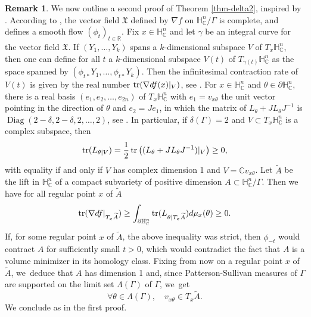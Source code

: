 \documentclass[JEP,XML,SOM,Unicode,NoEqCountersInSection,published]{cedram}
\theoremstyle{definition}
\newtheorem*{remark}{Remark}
\newcommand{\C}{\mathbb{C}}
\newcommand{\R}{\mathbb{R}}
\newcommand{\HNC}{\mathbb{H}^{n}_{\C}}
\newcommand{\PHNC}{\partial\mathbb{H}^{n}_{\C}}
\DeclareMathOperator{\Diag}{Diag}
\newcommand{\tr}{\textup{tr}}
\def\C{\mathbb{C}}
\newcommand{\HNC}{\mathbb{H}^{n}_{\C}}
\begin{document}
\begin{remark}
We now outline a second proof of Theorem \ref{thm-delta2}, inspired by \cite[Th.\,1.5]{connellNaturalFlowCritical2023}. According to \cite[Lem.\,2.2]{connellNaturalFlowCritical2023}, the vector field $\mathfrak{X}$ defined by $\nabla{f}$ on $\HNC/\Gamma$ is complete, and defines a smooth flow $(\phi_t)_{t\in \R}$. Fix $x\in \HNC$ and let $\gamma$ be an integral curve for the vector field $\mathfrak{X}$. If $(Y_1,\dots,Y_k)$ spans a $k$-dimensional subspace $V$ of $T_x\HNC$, then one can define for all $t$ a $k$-dimensional subspace $V(t)$ of $T_{\gamma(t)}\HNC$ as the space spanned by $(\phi_{t\ast}Y_1,\dots,\phi_{t\ast}Y_k)$. Then the infinitesimal contraction rate of $V(t)$ is given by the real number $\tr(\nabla d{f}(x)\vert_{ V})$, see \cite[Lem.\,2.5]{connellNaturalFlowCritical2023}. For $x\in \HNC$ and $\theta\in \PHNC$, there is a real basis $(e_1,e_2,\dots,e_{2n})$ of $T_{x}\HNC$ with $e_1=v_{x\theta}$ the unit vector pointing in the direction of $\theta$ and $e_2=Je_1$, in which the matrix of $L_{\theta} + JL_{\theta}J^{-1}$ is
$\Diag(2-\delta,2-\delta,2,\dots,2)$, see \cite[Proof of Lem.\,2.6]{connellNaturalFlowCritical2023}.
In particular, if $\delta(\Gamma)=2$ and $V\subset T_x\HNC$ is a complex subspace, then
\begin{equation*}
\tr(L_{\theta\vert V}) = \frac{1}{2}\,\tr\left((L_{\theta} + JL_{\theta}J^{-1})\vert_{ V}\right) \ge 0,
\end{equation*}
with equality if and only if $V$ has complex dimension 1 and $V=\C v_{x\theta}$.
Let $\widetilde{A}$ be the lift in $\HNC$ of a compact subvariety of positive dimension $A\subset\HNC/\Gamma$. Then we have for all regular point $x$ of $\widetilde{A}$
\begin{equation*}
\tr(\nabla d{f}\vert_{ T_x\widetilde{A}}) \ge \int_{\PHNC}\tr(L_{\theta\vert T_x\widetilde{A}})d\mu_x(\theta) \ge 0.
\end{equation*}
If, for some regular point $x$ of $\widetilde{A}$, the above inequality was strict, then $\phi_{-t}$ would contract $A$ for sufficiently small $t>0$, which would contradict the fact that $A$ is a volume minimizer in its homology class. Fixing from now on a regular point $x$ of $\widetilde{A}$, we~deduce that $A$ has dimension 1 and, since Patterson-Sullivan measures of $\Gamma$ are supported on the limit set $\Lambda(\Gamma)$ of $\Gamma$, we~get
\begin{equation*}
\forall \theta \in \Lambda(\Gamma),\quad v_{x\theta} \in T_x\widetilde{A}.
\end{equation*}
We conclude as in the first proof.
\end{remark}

\backmatter


\end{document}

